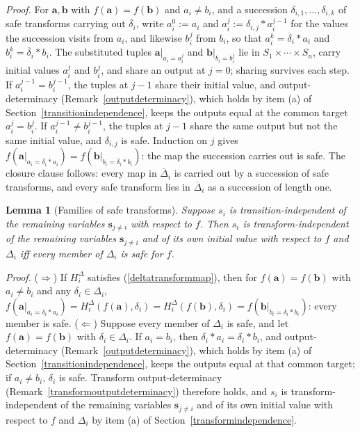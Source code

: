 \documentclass{article}
\newtheorem{lemma}[proposition]{Lemma}
\theoremstyle{definition}
\theoremstyle{remark}
\begin{document}
\noindent \textit{Proof.} For $\boldsymbol{a}, \boldsymbol{b}$ with $f(\boldsymbol{a}) = f(\boldsymbol{b})$ and $a_i \neq b_i$, and a succession $\delta_{i,1}, \ldots, \delta_{i,k}$ of safe transforms carrying out $\overline{\delta}_i$, write $a_i^{0} := a_i$ and $a_i^{j} := \delta_{i,j} \ast a_i^{j-1}$ for the values the succession visits from $a_i$, and likewise $b_i^{j}$ from $b_i$, so that $a_i^{k} = \overline{\delta}_i \ast a_i$ and $b_i^{k} = \overline{\delta}_i \ast b_i$. The substituted tuples $\boldsymbol{a}|_{a_i = a_i^{j}}$ and $\boldsymbol{b}|_{b_i = b_i^{j}}$ lie in $S_1 \times \cdots \times S_n$, carry initial values $a_i^{j}$ and $b_i^{j}$, and share an output at $j = 0$; sharing survives each step. If $a_i^{j-1} = b_i^{j-1}$, the tuples at $j-1$ share their initial value, and output-determinacy (Remark~\ref{outputdeterminacy}), which holds by item (a) of Section~\ref{transitionindependence}, keeps the outputs equal at the common target $a_i^{j} = b_i^{j}$. If $a_i^{j-1} \neq b_i^{j-1}$, the tuples at $j-1$ share the same output but not the same initial value, and $\delta_{i,j}$ is safe. Induction on $j$ gives $f(\boldsymbol{a}|_{a_i = \overline{\delta}_i \ast a_i}) = f(\boldsymbol{b}|_{b_i = \overline{\delta}_i \ast b_i})$: the map the succession carries out is safe. The closure clause follows: every map in $\overline{\Delta}_i$ is carried out by a succession of safe transforms, and every safe transform lies in $\overline{\Delta}_i$ as a succession of length one.

\begin{lemma}[Families of safe transforms]
\label{safefamilies}
Suppose $s_i$ is transition-independent of the remaining variables $\boldsymbol{s}_{j \neq i}$ with respect to $f$. Then $s_i$ is transform-independent of the remaining variables $\boldsymbol{s}_{j \neq i}$ and of its own initial value with respect to $f$ and $\Delta_i$ iff every member of $\Delta_i$ is safe for $f$.
\end{lemma}

\noindent \textit{Proof.} ($\Rightarrow$) If $H_i^\Delta$ satisfies (\ref{deltatransformmap}), then for $f(\boldsymbol{a}) = f(\boldsymbol{b})$ with $a_i \neq b_i$ and any $\delta_i \in \Delta_i$, $f(\boldsymbol{a}|_{a_i = \delta_i \ast a_i}) = H_i^\Delta(f(\boldsymbol{a}), \delta_i) = H_i^\Delta(f(\boldsymbol{b}), \delta_i) = f(\boldsymbol{b}|_{b_i = \delta_i \ast b_i})$: every member is safe. ($\Leftarrow$) Suppose every member of $\Delta_i$ is safe, and let $f(\boldsymbol{a}) = f(\boldsymbol{b})$ with $\delta_i \in \Delta_i$. If $a_i = b_i$, then $\delta_i \ast a_i = \delta_i \ast b_i$, and output-determinacy (Remark~\ref{outputdeterminacy}), which holds by item (a) of Section~\ref{transitionindependence}, keeps the outputs equal at that common target; if $a_i \neq b_i$, $\delta_i$ is safe. Transform output-determinacy (Remark~\ref{transformoutputdeterminacy}) therefore holds, and $s_i$ is transform-independent of the remaining variables $\boldsymbol{s}_{j \neq i}$ and of its own initial value with respect to $f$ and $\Delta_i$ by item (a) of Section~\ref{transformindependence}.
\end{document}
